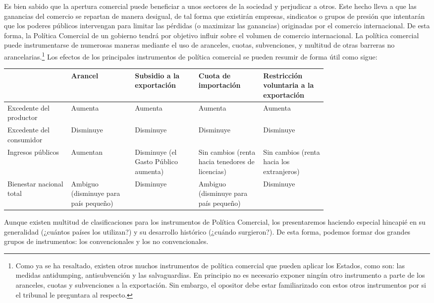 \documentclass[10pt,a4paper]{article}
\begin{document}
Es bien sabido que la apertura comercial puede beneficiar a unos sectores de la sociedad y perjudicar a otros. Este hecho lleva a que las ganancias del comercio se repartan de manera desigual, de tal forma que existirán empresas, sindicatos o grupos de presión que intentarán que los poderes públicos intervengan para limitar las pérdidas (o maximizar las ganancias) originadas por el comercio internacional. De esta forma, la Política Comercial de un gobierno tendrá por objetivo influir sobre el volumen de comercio internacional. La política comercial puede instrumentarse de numerosas maneras mediante el uso de aranceles, cuotas, subvenciones, y multitud de otras barreras no arancelarias.\footnote{%
    Como ya se ha resaltado, existen otros muchos instrumentos de política comercial que pueden aplicar los Estados, como son: las medidas antidumping, antisubvención y las salvaguardias. En principio no es necesario exponer ningún otro instrumento a parte de los aranceles, cuotas y subvenciones a la exportación. Sin embargo, el opositor debe estar familiarizado con estos otros instrumentos por si el tribunal le preguntara al respecto.
} Los efectos de los principales instrumentos de política comercial se pueden resumir de forma útil como sigue:

\begin{center}
\begin{tabular}{|p{0.15\linewidth}|p{0.15\linewidth}|p{0.15\linewidth}|p{0.15\linewidth}|p{0.15\linewidth}|}
\hline
 & \textbf{Arancel} & \textbf{Subsidio a la exportación} & \textbf{Cuota de importación} & \textbf{Restricción voluntaria a la exportación} \\
\hline
 Excedente del productor & Aumenta & Aumenta & Aumenta & Aumenta\\
\hline
Excedente del consumidor & Disminuye & Disminuye & Disminuye & Disminuye \\
\hline
Ingresos públicos & Aumentan & Disminuye (el Gasto Público aumenta) & Sin cambios (renta hacia tenedores de licencias) & Sin cambios (renta hacia los extranjeros) \\
\hline
Bienestar nacional total & Ambiguo (disminuye para país pequeño) & Disminuye & Ambiguo (disminuye para país pequeño) & Disminuye \\
\hline
\end{tabular}
\end{center}

Aunque existen multitud de clasificaciones para los instrumentos de Política Comercial, los presentaremos haciendo especial hincapié en su generalidad (¿cuántos países los utilizan?) y su desarrollo histórico (¿cuándo surgieron?). De esta forma, podemos formar dos grandes grupos de instrumentos: los convencionales y los no convencionales.
\end{document}
